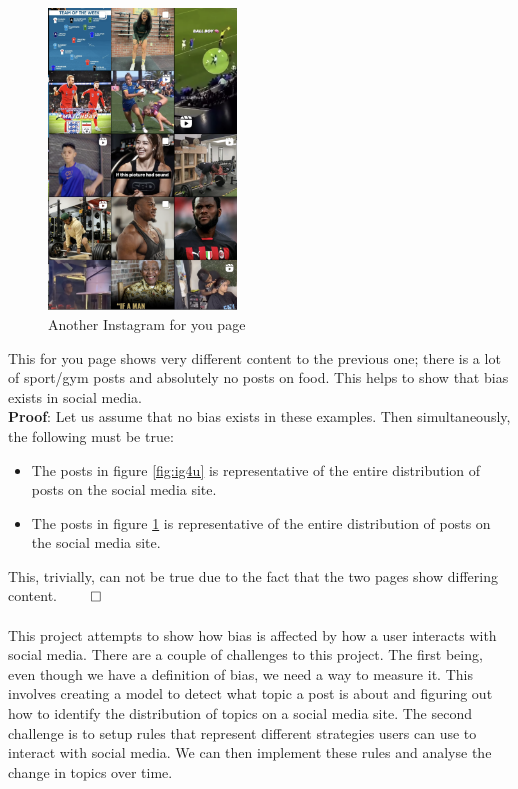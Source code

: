 \newpage

\begin{figure}[htbp]
    \centering
    \includegraphics[height=80mm]{../images/ig4u2.png}
    \caption{Another Instagram for you page}
    \label{fig:ig4u2}
\end{figure}

This for you page shows very different content to the previous one; there is a lot of sport/gym posts and absolutely no
posts on food. This helps to show that bias exists in social media.\\
\textbf{Proof}:
Let us assume that no bias exists in these examples.
Then simultaneously, the following must be true:
\begin{itemize}
    \item The posts in figure \ref{fig:ig4u} is representative of the entire distribution of posts on the social media site.
    \item The posts in figure \ref{fig:ig4u2} is representative of the entire distribution of posts on the social media site.
\end{itemize}

This, trivially, can not be true due to the fact that the two pages show differing content. $\qed$\\\\

This project attempts to show how bias is affected by how a user interacts with social media.
There are a couple of challenges to this project. The first being, even though we have a definition of bias,
we need a way to measure it. This involves creating a model to detect what topic a post is about and figuring
out how to identify the distribution of topics on a social media site. The second challenge is to setup rules that
represent different strategies users can use to interact with social media. We can then implement these rules
and analyse the change in topics over time.


